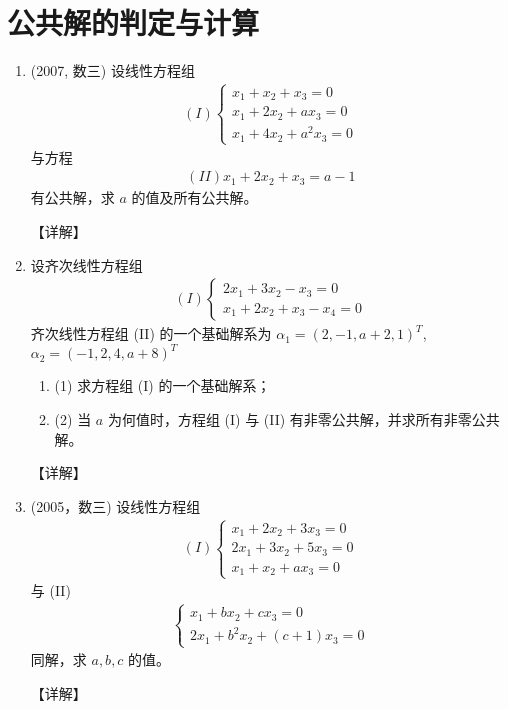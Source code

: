 \documentclass[12pt, a4paper, oneside, UTF8]{ctexbook}
\begin{document}
\section{公共解的判定与计算}

\begin{enumerate}[label=\arabic*.,start=12]
    \item (2007, 数三) 设线性方程组
    \begin{align*}
    (I) \begin{cases}
    x_1 + x_2 + x_3 = 0 \\
    x_1 + 2x_2 + a x_3 = 0 \\
    x_1 + 4x_2 + a^2 x_3 = 0
    \end{cases}
    \end{align*}
    与方程
    \begin{align*}
    (II) x_1 + 2x_2 + x_3 = a - 1
    \end{align*}
    有公共解，求 $a$ 的值及所有公共解。
    
    \begin{solution}
    【详解】
    \end{solution}
    
    \item 设齐次线性方程组
    \begin{align*}
    (I) \begin{cases}
    2x_1 + 3x_2 - x_3 = 0 \\
    x_1 + 2x_2 + x_3 - x_4 = 0
    \end{cases}
    \end{align*}
    齐次线性方程组 (II) 的一个基础解系为 $\alpha_1 = (2, -1, a+2, 1)^T$, $\alpha_2 = (-1, 2, 4, a+8)^T$ 
    \begin{enumerate}
        \item (1) 求方程组 (I) 的一个基础解系；
        \item (2) 当 $a$ 为何值时，方程组 (I) 与 (II) 有非零公共解，并求所有非零公共解。
    \end{enumerate}
    
    \begin{solution}
    【详解】
    \end{solution}
    
    \item (2005，数三) 设线性方程组
    \begin{align*}
    (I) \begin{cases}
    x_1 + 2x_2 + 3x_3 = 0 \\
    2x_1 + 3x_2 + 5x_3 = 0 \\
    x_1 + x_2 + a x_3 = 0
    \end{cases}
    \end{align*}
    与 (II) 
    \begin{align*}
    \begin{cases}
    x_1 + b x_2 + c x_3 = 0 \\
    2x_1 + b^2 x_2 + (c+1) x_3 = 0
    \end{cases}
    \end{align*}
    同解，求 $a, b, c$ 的值。
    
    \begin{solution}
    【详解】
    \end{solution}
\end{enumerate}


\ifx\allfiles\undefined
\end{document}
